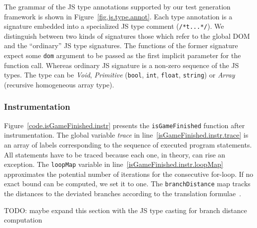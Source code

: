 \documentclass[sigconf,review,anonymous]{acmart}
\begin{document}
The grammar of the JS type annotations supported by our test generation framework is shown in Figure~\ref{fig.js.type.annot}. Each type annotation is a signature embedded into a specialized JS type comment (\texttt{/*t...*/}). We distinguish between two kinds of signatures those which refer to the global DOM and the ``ordinary'' JS type signatures. The functions of the former signature expect some \texttt{dom} argument to be passed as the first implicit parameter for the function call. Whereas ordinary JS signature is a non-zero sequence of the JS types. The type can be \emph{Void}, \emph{Primitive} (\texttt{bool}, \texttt{int}, \texttt{float}, \texttt{string}) or \emph{Array} (recursive homogeneous array type).  

\subsubsection{Instrumentation}
\label{sub.sec.instrument}

Figure~\ref{code.isGameFinished.instr} presents the \texttt{isGameFinished} function after instrumentation. The global variable \emph{trace} in line~\ref{isGameFinished.instr.trace} is an array of labels corresponding to the sequence of executed program statements. All statements have to be traced because each one, in theory, can rise an exception. The \texttt{loopMap} variable in line~\ref{isGameFinished.instr.loopMap} approximates the potential number of iterations for the consecutive for-loop. If no exact bound can be computed, we set it to one. The \texttt{branchDistance} map tracks the distances to the deviated branches according to the translation formulae~\cite{tracey1998automated}.  

TODO: maybe expand this section with the JS type casting for branch distance computation 
\end{document}
